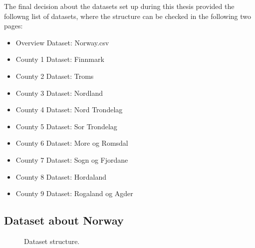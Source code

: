 The final decision about the datasets set up during this thesis provided the followng list of datasets, where the structure can be checked in the following two pages:
 \setlength{\itemsep}{-5pt}
\begin{itemize}
\item Overview Dataset: Norway.csv
\vspace{-2mm}
\item County 1 Dataset: Finnmark
\vspace{-2mm}
\item County 2 Dataset: Troms
\vspace{-2mm}
\item County 3 Dataset: Nordland
\vspace{-2mm}
\item County 4 Dataset: Nord Trondelag
\vspace{-2mm}
\item County 5 Dataset: Sor Trondelag
\vspace{-2mm}
\item County 6 Dataset: More og Romsdal
\vspace{-2mm}
\item County 7 Dataset: Sogn og Fjordane
\vspace{-2mm}
\item County 8 Dataset: Hordaland
\vspace{-2mm}
\item County 9 Dataset: Rogaland og Agder
\end{itemize}

\newpage

\subsection{Dataset about Norway}

\begin{figure}[H]
    \caption{Dataset structure.}
\end{figure}

